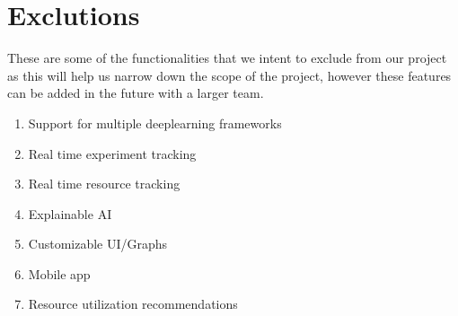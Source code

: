 \documentclass[12pt]{article}
\begin{document}
\section{Exclutions}
These are some of the functionalities that we intent to exclude from our project as this will help us narrow down the scope of the project, however these features can be added in the future with a larger team.
\begin{enumerate}
    \item Support for multiple deeplearning frameworks
    \item Real time experiment tracking
    \item Real time resource tracking
    \item Explainable AI
    \item Customizable UI/Graphs
    \item Mobile app
    \item Resource utilization recommendations










    
    
       


\end{enumerate}
\end{document}
